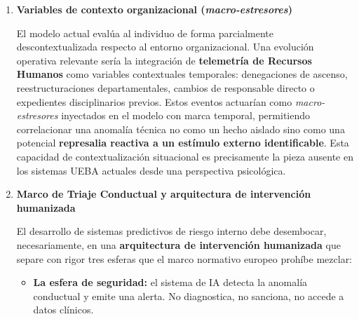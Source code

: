 \documentclass[IB]{TFUOC}%
\begin{document}
\begin{enumerate}
    El análisis de sentimiento polarizado actual (\textit{Z-Score} VADER) es operativamente eficaz pero semánticamente superficial. 
    Se propone la evolución del módulo de Procesamiento de Lenguaje Natural (NLP) hacia arquitecturas de de modelos grandes LLM fundamentadas en la \textbf{Teoría de los Marcos Relacionales} (Hayes et al., 2001, 2016), marco teórico subyacente a la Terapia de Aceptación y Compromiso (ACT). Aplicada al análisis de texto corporativo, la RFT habilitaría trascender la detección de polaridad léxica para inferir cómo el empleado \textbf{enmarca cognitivamente su relación de identidad con la organización}: patrones de alienación progresiva (``nosotros vs. ellos''), disonancia entre esfuerzo percibido y reconocimiento recibido, o erosión del compromiso organizacional. Estos constructos corresponden exactamente a la fase de ``ideación'' del modelo CPIR, que el análisis de sentimiento actual solo aproxima de forma indirecta.

    \item \textbf{Variables de contexto organizacional 
    (\textit{macro-estresores})}
    
    El modelo actual evalúa al individuo de forma parcialmente descontextualizada respecto al entorno organizacional. Una evolución operativa relevante sería la integración de \textbf{telemetría de Recursos Humanos} como variables contextuales temporales: denegaciones de ascenso, reestructuraciones departamentales, cambios de responsable directo o expedientes disciplinarios previos. Estos eventos actuarían como \textit{macro-estresores} inyectados en el modelo con marca temporal, permitiendo correlacionar una 
    anomalía técnica no como un hecho aislado sino como una potencial \textbf{represalia reactiva a un estímulo externo identificable}. Esta capacidad de contextualización situacional es precisamente la pieza ausente en los sistemas UEBA actuales desde una perspectiva psicológica.

    \item \textbf{Marco de Triaje Conductual y arquitectura de intervención humanizada}
    
    El desarrollo de sistemas predictivos de riesgo interno debe desembocar, necesariamente, en una \textbf{arquitectura de intervención humanizada} que separe con rigor tres esferas que el marco normativo europeo prohíbe mezclar:

    \begin{itemize}
        \item \textbf{La esfera de seguridad:} el sistema de IA detecta la anomalía conductual y emite una alerta. No diagnostica, no sanciona, no accede a datos clínicos.
        

\end{itemize}
\end{enumerate}
\end{document}
